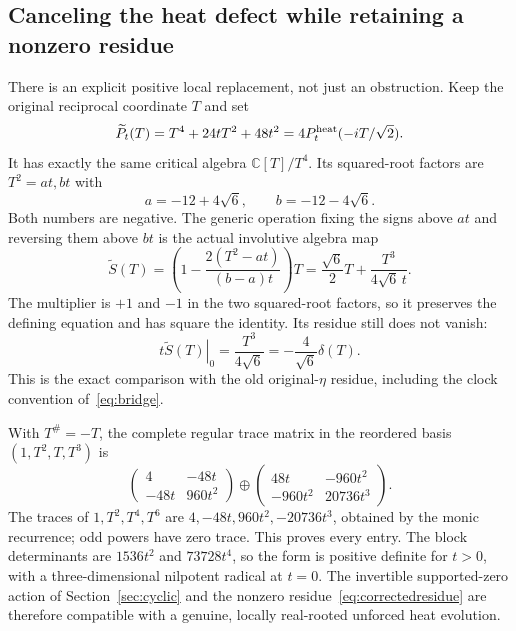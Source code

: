\documentclass[11pt,a4paper]{article}
\theoremstyle{definition}\newtheorem{definition}[theorem]{Definition}\newtheorem{remark}[theorem]{Remark}
\newcommand{\C}{\mathbb C}\newcommand{\R}{\mathbb R}\newcommand{\Z}{\mathbb Z}\newcommand{\B}{\mathbb B}
\begin{document}
\subsection{Canceling the heat defect while retaining a nonzero residue}
There is an explicit positive local replacement, not just an obstruction. Keep the original reciprocal coordinate $T$ and set
\begin{equation}
 \widetilde P_t(T)=T^4+24tT^2+48t^2
                 =4P_t^{\rm heat}(-iT/\sqrt2).
                                                        \label{eq:correctedT}
\end{equation}
It has exactly the same critical algebra $\C[T]/T^4$. Its squared-root factors are $T^2=a t,b t$ with
\[
 a=-12+4\sqrt6,\qquad b=-12-4\sqrt6.
\]
Both numbers are negative. The generic operation fixing the signs above $at$ and reversing them above $bt$ is the actual involutive algebra map
\begin{equation}
 \widetilde S(T)=\left(1-\frac{2(T^2-at)}{(b-a)t}\right)T
 =\frac{\sqrt6}{2}T+\frac{T^3}{4\sqrt6\,t}.
                                                        \label{eq:correctedS}
\end{equation}
The multiplier is $+1$ and $-1$ in the two squared-root factors, so it preserves the defining equation and has square the identity. Its residue still does not vanish:
\begin{equation}
 \left.t\widetilde S(T)\right|_0=\frac{T^3}{4\sqrt6}
                  =-\frac4{\sqrt6}\delta(T).             \label{eq:correctedresidue}
\end{equation}
This is the exact comparison with the old original-$\eta$ residue, including the clock convention of~\eqref{eq:bridge}.

With $T^\#=-T$, the complete regular trace matrix in the reordered basis $(1,T^2,T,T^3)$ is
\begin{equation}
 \begin{pmatrix}4&-48t\\-48t&960t^2\end{pmatrix}
 \oplus
 \begin{pmatrix}48t&-960t^2\\-960t^2&20736t^3\end{pmatrix}.
                                                        \label{eq:correctedGram}
\end{equation}
The traces of $1,T^2,T^4,T^6$ are $4,-48t,960t^2,-20736t^3$, obtained by the monic recurrence; odd powers have zero trace. This proves every entry. The block determinants are $1536t^2$ and $73728t^4$, so the form is positive definite for $t>0$, with a three-dimensional nilpotent radical at $t=0$. The invertible supported-zero action of Section~\ref{sec:cyclic} and the nonzero residue~\eqref{eq:correctedresidue} are therefore compatible with a genuine, locally real-rooted unforced heat evolution.
\end{document}

